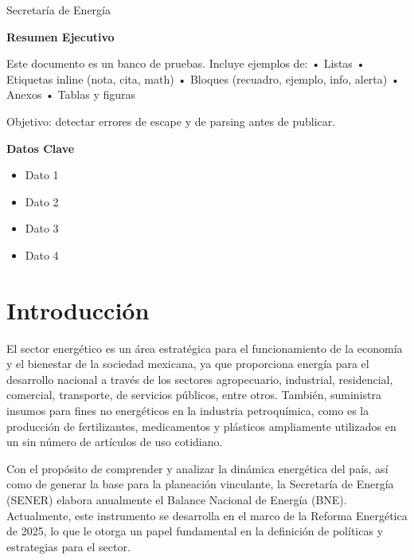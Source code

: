 \documentclass{sener2025}
\begin{document}
 Secretaría de Energía

\clearpage
\begin{center}
{\Large\patriafont\bfseries\color{gobmxGuinda}Resumen Ejecutivo}\\[1cm]
\end{center}

Este documento es un banco de pruebas. Incluye ejemplos de:
• Listas
• Etiquetas inline (nota, cita, math)
• Bloques (recuadro, ejemplo, info, alerta)
• Anexos
• Tablas y figuras

Objetivo: detectar errores de escape y de parsing antes de publicar.

\clearpage
\begin{center}
{\Large\patriafont\bfseries\color{gobmxGuinda}Datos Clave}\\[1cm]
\end{center}

\begin{itemize}
  \item Dato 1
  \item Dato 2
  \item Dato 3
  \item Dato 4
\end{itemize}


\section{Introducción}

El sector energético es un área estratégica para el funcionamiento de la economía y el bienestar de la sociedad mexicana, ya que proporciona energía para el desarrollo nacional a través de los sectores agropecuario, industrial, residencial, comercial, transporte, de servicios públicos, entre otros. También, suministra insumos para fines no energéticos en la industria petroquímica, como es la producción de fertilizantes, medicamentos y plásticos ampliamente utilizados en un sin número de artículos de uso cotidiano.

Con el propósito de comprender y analizar la dinámica energética del país, así como de generar la base para la planeación vinculante, la Secretaría de Energía (SENER) elabora anualmente el Balance Nacional de Energía (BNE). Actualmente, este instrumento se desarrolla en el marco de la Reforma Energética de 2025, lo que le otorga un papel fundamental en la definición de políticas y estrategias para el sector.
\end{document}
